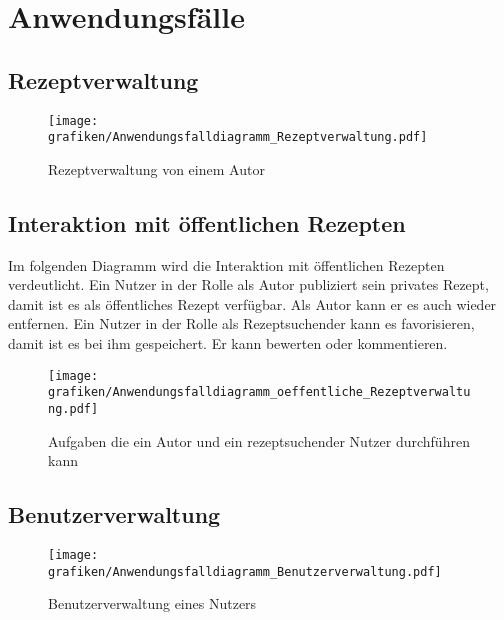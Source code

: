 \section{Anwendungsfälle}

\subsection{Rezeptverwaltung}
\begin{figure}[H]
	\begin{center}

	\texttt{[image: grafiken/Anwendungsfalldiagramm\_Rezeptverwaltung.pdf]}
	\caption{Rezeptverwaltung von einem Autor}
		\end{center}
\end{figure}

\subsection{Interaktion mit öffentlichen Rezepten}
Im folgenden Diagramm wird die Interaktion mit öffentlichen Rezepten verdeutlicht. Ein Nutzer in der Rolle als \gls{Autor} publiziert sein privates Rezept, damit ist es als öffentliches Rezept verfügbar. Als \gls{Autor} kann er es auch wieder entfernen. 
Ein Nutzer in der Rolle als Rezeptsuchender kann es favorisieren, damit ist es bei ihm gespeichert. Er kann bewerten oder kommentieren. 

\begin{figure}[H]
\begin{center}
	\texttt{[image: grafiken/Anwendungsfalldiagramm\_oeffentliche\_Rezeptverwaltung.pdf]}
	\caption{Aufgaben die ein Autor und ein rezeptsuchender Nutzer durchführen kann}
\end{center}
\end{figure}


\subsection{Benutzerverwaltung}
\begin{figure}[H]
\begin{center}
	\texttt{[image: grafiken/Anwendungsfalldiagramm\_Benutzerverwaltung.pdf]}
	\caption{Benutzerverwaltung eines Nutzers}
\end{center}
\end{figure}





